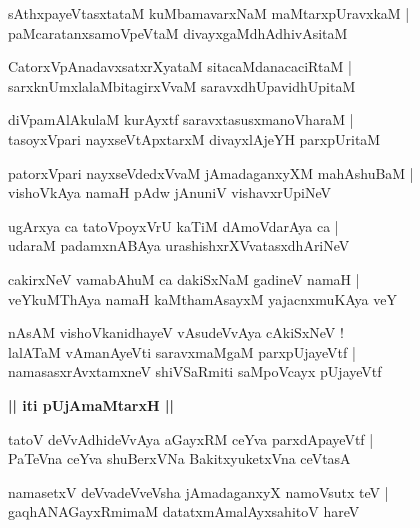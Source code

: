 \documentclass[twoside,12pt,openright]{book}
\newcounter{shloka}[chapter]
\def\uvaca#1{\centerline{{\large\textbf{#1}}}}
\begin{document}
\begin{shloka}%
sAthxpayeVtasxtataM kuMbamavarxNaM maMtarxpUravxkaM |\\
paMcaratanxsamoVpeVtaM divayxgaMdhAdhivAsitaM 
\end{shloka}

\begin{shloka}%
CatorxVpAnadavxsatxrXyataM sitacaMdanacaciRtaM |\\
sarxknUmxlalaMbitagirxVvaM saravxdhUpavidhUpitaM
\end{shloka}

\begin{shloka}%
diVpamAlAkulaM kurAyxtf saravxtasusxmanoVharaM |\\
tasoyxVpari nayxseVtApxtarxM divayxlAjeYH parxpUritaM 
\end{shloka}

\begin{shloka}%
patorxVpari nayxseVdedxVvaM jAmadaganxyXM mahAshuBaM |\\
vishoVkAya namaH pAdw jAnuniV vishavxrUpiNeV 
\end{shloka}

\begin{shloka}%
ugArxya ca tatoVpoyxVrU kaTiM dAmoVdarAya ca |\\
udaraM padamxnABAya urashishxrXVvatasxdhAriNeV
\end{shloka}

\begin{shloka}%
cakirxNeV vamabAhuM ca dakiSxNaM gadineV namaH |\\
veYkuMThAya namaH kaMthamAsayxM yajacnxmuKAya veY 
\end{shloka}

\begin{shloka}%
nAsAM vishoVkanidhayeV vAsudeVvAya cAkiSxNeV !\\
lalATaM vAmanAyeVti saravxmaMgaM parxpUjayeVtf |\\
namasasxrAvxtamxneV shiVSaRmiti saMpoVcayx pUjayeVtf
\end{shloka}

\uvaca{|| iti pUjAmaMtarxH ||}

\begin{shloka}%
tatoV deVvAdhideVvAya aGayxRM ceYva parxdApayeVtf |\\
PaTeVna ceYva shuBerxVNa BakitxyuketxVna ceVtasA
\end{shloka}

\begin{shloka}%
namasetxV deVvadeVveVsha jAmadaganxyX namoVsutx teV |\\
gaqhANAGayxRmimaM datatxmAmalAyxsahitoV hareV 
\end{shloka}
\end{document}
